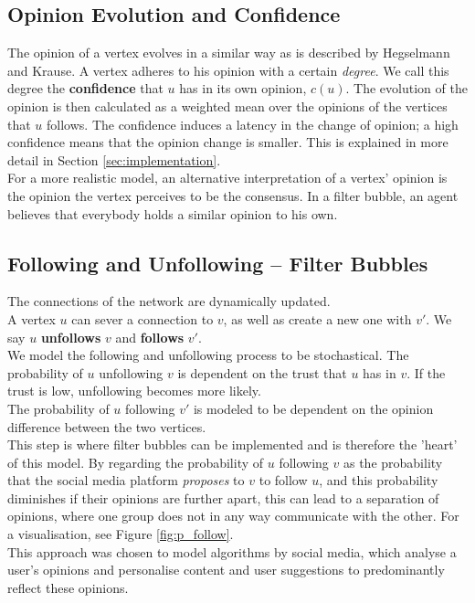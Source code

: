 \documentclass[11pt]{article}
\begin{document}
\subsection{Opinion Evolution and Confidence}
The opinion of a vertex evolves in a similar way as is described by Hegselmann and Krause\cite{review_od}. A vertex adheres to his opinion with a certain \textit{degree}. We call this degree the \textbf{confidence} that $u$ has in its own opinion, $c(u)$. The evolution of the opinion is then calculated as a weighted mean over the opinions of the vertices that $u$ follows. The confidence induces a latency in the change of opinion; a high confidence means that the opinion change is smaller. This is explained in more detail in Section \ref{sec:implementation}.\\

For a more realistic model, an alternative interpretation of a vertex' opinion is the opinion the vertex perceives to be the consensus. In a filter bubble, an agent believes that everybody holds a similar opinion to his own.

\subsection{Following and Unfollowing -- Filter Bubbles}

The connections of the network are dynamically updated.\\
A vertex $u$ can sever a connection to $v$, as well as create a new one with $v'$. We say $u$ \textbf{unfollows} $v$ and \textbf{follows} $v'$.\\
We model the following and unfollowing process to be stochastical.
The probability of $u$ unfollowing $v$ is dependent on the trust that $u$ has in $v$. If the trust is low, unfollowing becomes more likely.\\
The probability of $u$ following $v'$ is modeled to be dependent on the opinion difference between the two vertices.\\

This step is where filter bubbles can be implemented and is therefore the 'heart' of this model. By regarding the probability of $u$ following $v$ as the probability that the social media platform \textit{proposes} to $v$ to follow $u$, and this probability diminishes if their opinions are further apart, this can lead to a separation of opinions, where one group does not in any way communicate with the other. For a visualisation, see Figure \ref{fig:p_follow}.\\
This approach was chosen to model algorithms by social media, which analyse a user's opinions and personalise content and user suggestions to predominantly reflect these opinions.
\end{document}
